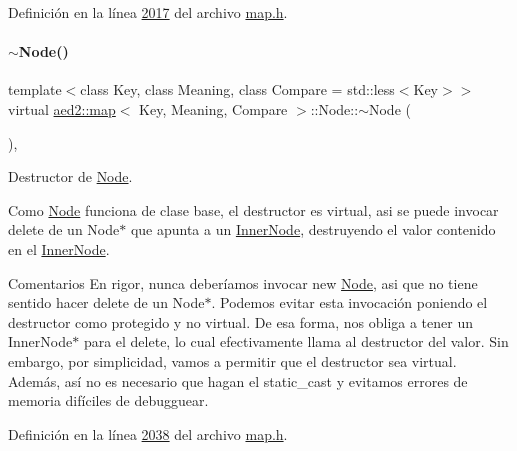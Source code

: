 Definición en la línea \hyperlink{map_8h_source_l02017}{2017} del archivo \hyperlink{map_8h_source}{map.\+h}.

\mbox{\label{structaed2_1_1map_1_1Node_a4f3cb2cc4302fe96432e624ced147540_a4f3cb2cc4302fe96432e624ced147540}} 
\paragraph{\texorpdfstring{$\sim$\+Node()}{~Node()}}
{\footnotesize\ttfamily template$<$class Key, class Meaning, class Compare = std\+::less$<$\+Key$>$$>$ \\
virtual \hyperlink{classaed2_1_1map}{aed2\+::map}$<$ Key, Meaning, Compare $>$\+::Node\+::$\sim$\+Node (\begin{DoxyParamCaption}{ }\end{DoxyParamCaption})\hspace{0.3cm}{\ttfamily [inline]}, {\ttfamily [virtual]}}



Destructor de \hyperlink{structaed2_1_1map_1_1Node}{Node}. 

Como \hyperlink{structaed2_1_1map_1_1Node}{Node} funciona de clase base, el destructor es virtual, asi se puede invocar delete de un Node$\ast$ que apunta a un \hyperlink{structaed2_1_1map_1_1InnerNode}{Inner\+Node}, destruyendo el valor contenido en el \hyperlink{structaed2_1_1map_1_1InnerNode}{Inner\+Node}.

\begin{DoxyRemark}{Comentarios}
En rigor, nunca deberíamos invocar new \hyperlink{structaed2_1_1map_1_1Node}{Node}, asi que no tiene sentido hacer delete de un Node$\ast$. Podemos evitar esta invocación poniendo el destructor como protegido y no virtual. De esa forma, nos obliga a tener un Inner\+Node$\ast$ para el delete, lo cual efectivamente llama al destructor del valor. Sin embargo, por simplicidad, vamos a permitir que el destructor sea virtual. Además, así no es necesario que hagan el {\ttfamily static\+\_\+cast} y evitamos errores de memoria difíciles de debugguear. 
\end{DoxyRemark}


Definición en la línea \hyperlink{map_8h_source_l02038}{2038} del archivo \hyperlink{map_8h_source}{map.\+h}.




